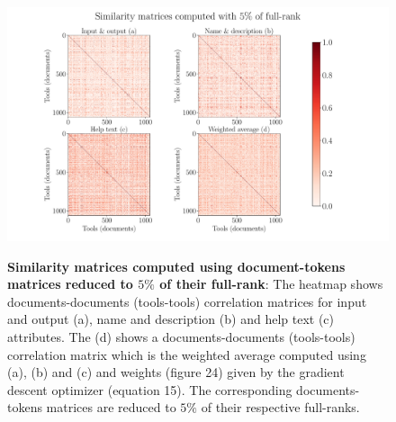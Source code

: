 \begin{figure}[h]
\begin{centering}
    {\includegraphics[scale=0.4]{figures/Similarity_matrices_005.pdf}}
    \caption[Similarity matrices computed using document-tokens matrices reduced to $5\%$ of their full-rank]{\textbf{Similarity matrices computed using document-tokens matrices reduced to $5\%$ of their full-rank}: The heatmap shows documents-documents (tools-tools) correlation matrices for input and output (a), name and description (b) and help text (c) attributes. The (d) shows a documents-documents (tools-tools) correlation matrix which is the weighted average computed using (a), (b) and (c) and weights (figure 24) given by the gradient descent optimizer (equation 15). The corresponding documents-tokens matrices are reduced to $5\%$ of their respective full-ranks.}
\end{centering}
\end{figure}

